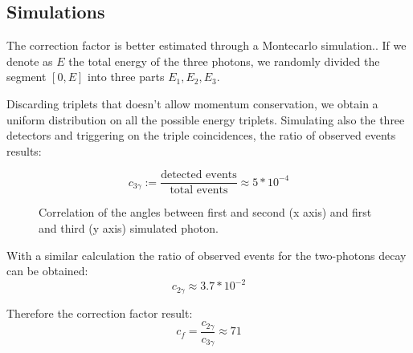 \documentclass[main.tex]{subfiles}
\begin{document}
\subsection{Simulations}

The correction factor is better estimated through a Montecarlo simulation.. If we denote as $E$ the total energy of the three photons, we randomly divided the segment $[0,E]$ into three parts $E_1,E_2,E_3$.
%
%
%

Discarding triplets that doesn't allow momentum conservation, we obtain a uniform distribution on all the possible energy triplets. %
Simulating also the three detectors and triggering on the triple coincidences, the ratio of observed events results:

\begin{equation*}
  c_{3\gamma} := \frac{\text{detected events}}{\text{total events}} \approx 5*10^{-4}
\end{equation*}

\begin{figure}[H]
  \centering
  \caption{Correlation of the angles between first and second (x axis) and first and third (y axis) simulated photon.}
  \label{fig:sim:ang:corr}
\end{figure}

With a similar calculation the ratio of observed events for the two-photons decay can be obtained:
\begin{equation*}
  c_{2\gamma} \approx 3.7*10^{-2}
\end{equation*}

Therefore the correction factor result:
\begin{equation}
  c_f = \frac{c_{2\gamma}}{c_{3\gamma}} \approx 71
\end{equation}
\end{document}
